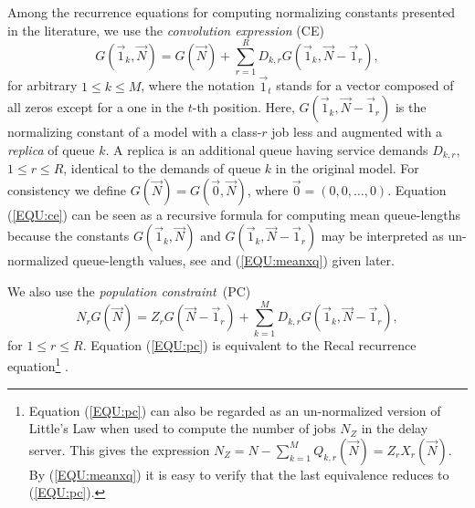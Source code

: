 \documentclass[journal,twocolumn,9.5pt]{IEEEtran}
\begin{document}
Among the recurrence equations for computing normalizing constants presented in the literature, we use the  {\em convolution expression} (CE) \cite{ReiK75b,ChaS80}
\begin{equation}
\label{EQU:ce}
\textstyle G(\vec 1_k,\vec N)=G(\vec N)+\sum_{r=1}^R D_{k,r}G(\vec 1_k,\vec N-\vec 1_r),
\end{equation}
for arbitrary $1\leq k\leq M$, where the notation $\vec{1}_t$ stands for a vector composed of all zeros except for a one in the $t$-th position. Here, $G(\vec 1_k,\vec N-\vec{1}_r)$ is the normalizing constant of a model with a class-$r$ job less and augmented with a {\em replica} of queue $k$. A replica is an additional queue having service demands $D_{k,r}$, $1\leq r\leq R$, identical to the demands of queue $k$ in the original model. For consistency we define $G(\vec N)=G(\vec 0,\vec N)$, where $\vec 0=(0,0,\ldots,0)$. Equation (\ref{EQU:ce}) can be seen as a recursive formula for computing mean queue-lengths because the constants $G(\vec 1_k,\vec N)$ and $G(\vec 1_k,\vec N-\vec 1_r)$ may be interpreted as un-normalized queue-length values, see \cite{Lam83} and (\ref{EQU:meanxq}) given later. %

We also use the {\em population constraint}~(PC)
\begin{equation}
\label{EQU:pc}
\textstyle N_rG(\vec N)=Z_rG(\vec N-\vec 1_r)+\sum_{k=1}^M D_{k,r}G(\vec 1_k,\vec N-\vec 1_r),
\end{equation}
for $1\leq r\leq R$. Equation (\ref{EQU:pc}) is equivalent to the {\sc Recal} recurrence equation\footnote{Equation (\ref{EQU:pc}) can also be regarded as an un-normalized version of Little's Law\cite{Cas06b} when used to compute the number of jobs $N_Z$ in the delay server. This gives the expression $N_Z=N-\sum_{k=1}^M Q_{k,r}(\vec N)=Z_rX_r(\vec N)$. By (\ref{EQU:meanxq}) it is easy to verify that the last equivalence reduces to (\ref{EQU:pc}).} \cite{ConG86,Cas06b}.
\end{document}
